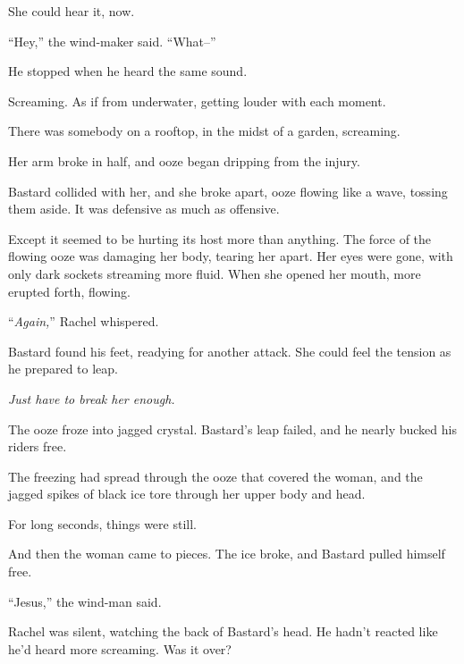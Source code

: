 She could hear it, now.



``Hey,'' the wind-maker said.  ``What--''



He stopped when he heard the same sound.



Screaming.  As if from underwater, getting louder with each moment.



There was somebody on a rooftop, in the midst of a garden, screaming.



Her arm broke in half, and ooze began dripping from the injury.



Bastard collided with her, and she broke apart, ooze flowing like a wave, tossing them aside.  It was defensive as much as offensive.



Except it seemed to be hurting its host more than anything.  The force of the flowing ooze was damaging her body, tearing her apart.  Her eyes were gone, with only dark sockets streaming more fluid.  When she opened her mouth, more erupted forth, flowing.



``\emph{Again,}'' Rachel whispered.



Bastard found his feet, readying for another attack.  She could feel the tension as he prepared to leap.



\emph{Just have to break her enough.}



The ooze froze into jagged crystal.  Bastard's leap failed, and he nearly bucked his riders free.



The freezing had spread through the ooze that covered the woman, and the jagged spikes of black ice tore through her upper body and head.



For long seconds, things were still.



And then the woman came to pieces.  The ice broke, and Bastard pulled himself free.



``Jesus,'' the wind-man said.



Rachel was silent, watching the back of Bastard's head.  He hadn't reacted like he'd heard more screaming.  Was it over?



